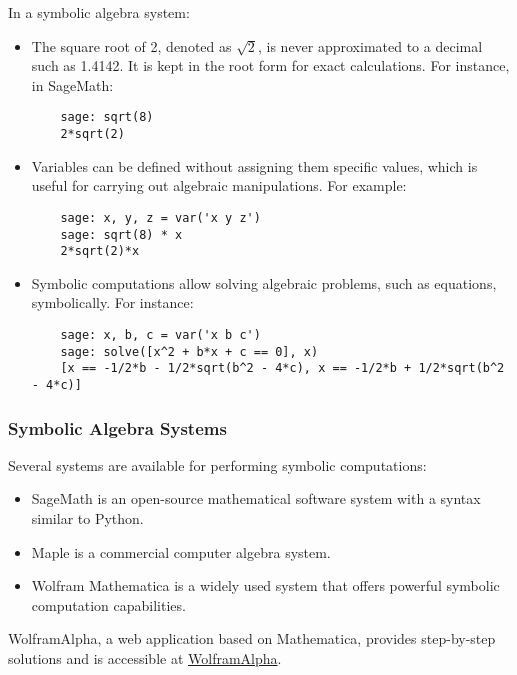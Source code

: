 \documentclass[12pt]{article}
\begin{document}
In a symbolic algebra system:
\begin{itemize}
    \item The square root of 2, denoted as \(\sqrt{2}\), is never approximated to a decimal such as 1.4142. It is kept in the root form for exact calculations. For instance, in SageMath:
    \begin{lstlisting}
    sage: sqrt(8)
    2*sqrt(2)
    \end{lstlisting}

    \item Variables can be defined without assigning them specific values, which is useful for carrying out algebraic manipulations. For example:
    \begin{lstlisting}
    sage: x, y, z = var('x y z')
    sage: sqrt(8) * x
    2*sqrt(2)*x
    \end{lstlisting}

    \item Symbolic computations allow solving algebraic problems, such as equations, symbolically. For instance:
    \begin{lstlisting}
    sage: x, b, c = var('x b c')
    sage: solve([x^2 + b*x + c == 0], x)
    [x == -1/2*b - 1/2*sqrt(b^2 - 4*c), x == -1/2*b + 1/2*sqrt(b^2 - 4*c)]
    \end{lstlisting}
\end{itemize}

\subsubsection{Symbolic Algebra Systems}
Several systems are available for performing symbolic computations:

\begin{itemize}
    \item SageMath is an open-source mathematical software system with a syntax similar to Python.
    \item Maple is a commercial computer algebra system.
    \item Wolfram Mathematica is a widely used system that offers powerful symbolic computation capabilities.
\end{itemize}

WolframAlpha, a web application based on Mathematica, provides step-by-step solutions and is accessible at \href{http://www.wolframalpha.com}{WolframAlpha}.
\end{document}
